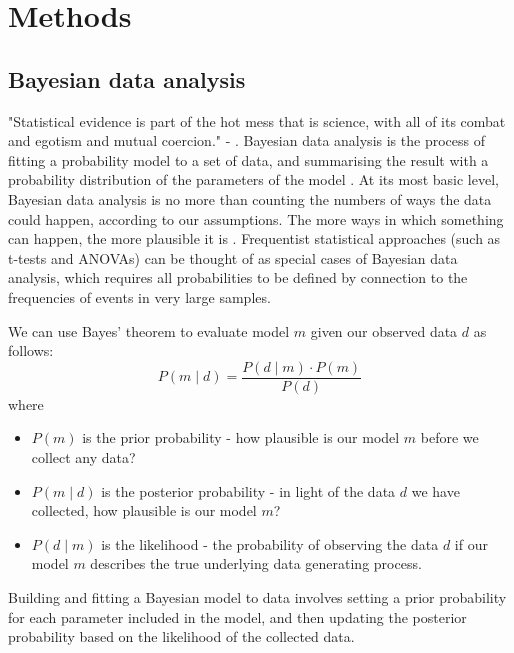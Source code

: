 \chapter{\label{ch:2-methods}Methods}

\graphicspath{{figures/ch2/}}

\minitoc

\section{Bayesian data analysis}
"Statistical evidence is part of the hot mess that is science, with all of its combat and egotism and mutual coercion." - \textcite{mcelreath_statistical_2020}.
Bayesian data analysis is the process of fitting a probability model to a set of data, and summarising the result with a probability distribution of the parameters of the model \cite{gelman_bayesian_2014}.
At its most basic level, Bayesian data analysis is no more than counting the numbers of ways the data could happen, according to our assumptions.
The more ways in which something can happen, the more plausible it is \cite{mcelreath_statistical_2020}.
Frequentist statistical approaches (such as t-tests and ANOVAs) can be thought of as special cases of Bayesian data analysis, which requires all probabilities to be defined by connection to the frequencies of events in very large samples.

We can use Bayes' theorem to evaluate model $m$ given our observed data $d$ as follows:
\begin{equation}
P(m \mid d) = \frac{P(d \mid m) \cdot P(m)}{P(d)}
\end{equation}
where
\begin{itemize}
\item $P(m)$ is the prior probability - how plausible is our model $m$ before we collect any data?
\item $P(m \mid d)$ is the posterior probability - in light of the data $d$ we have collected, how plausible is our model $m$?
\item $P(d \mid m)$ is the likelihood - the probability of observing the data $d$ if our model $m$ describes the true underlying data generating process.
\end{itemize}

Building and fitting a Bayesian model to data involves setting a prior probability for each parameter included in the model, and then updating the posterior probability based on the likelihood of the collected data.


